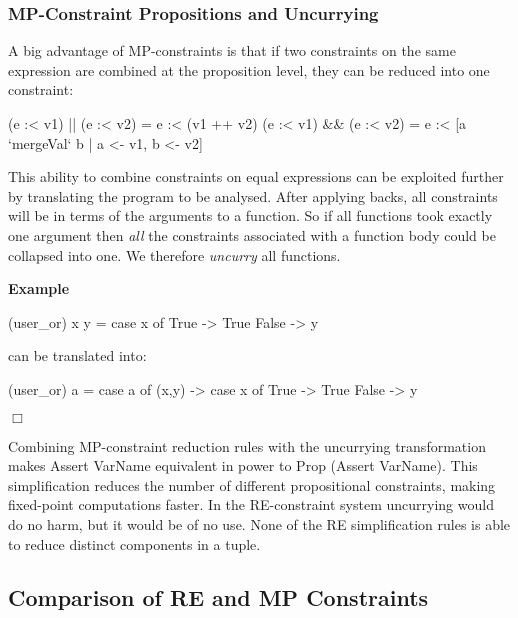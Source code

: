 \documentclass[preprint]{sigplanconf}
\newcommand{\C}[1]{\textsf{#1}}
\newcounter{exmp}
\newcommand{\yesexample}{\addtocounter{exmp}{1}\addvspace{2mm}\noindent\textbf{Example \arabic{exmp}}}
\newcommand{\noexample}{\hfill\ensuremath{\Box}\par\addvspace{2mm}}
\newenvironment{example}{\yesexample}{\noexample}
\begin{document}
\subsubsection{MP-Constraint Propositions and Uncurrying}

A big advantage of MP-constraints is that if two constraints on the same expression are combined at the proposition level, they can be reduced into one constraint:

\begin{code}
(e :< v1) || (e :< v2) = e :< (v1 ++ v2)
(e :< v1) && (e :< v2) = e :< [a `mergeVal` b | a <- v1, b <- v2]
\end{code}

\noindent This ability to combine constraints on equal expressions can be exploited further by translating the program to be analysed. After applying \C{backs}, all constraints will be in terms of the arguments to a function. So if all functions took exactly one argument then \textit{all} the constraints associated with a function body could be collapsed into one. We therefore \textit{uncurry} all functions.

\begin{example}
\begin{code}
(user_or) x y = case  x of
                      True   -> True
                      False  -> y
\end{code}

\noindent can be translated into:

\begin{code}
(user_or) a = case  a of
                    (x,y) -> case  x of
                                   True    -> True
                                   False   -> y
\end{code}
\end{example}

Combining MP-constraint reduction rules with the uncurrying transformation makes \C{Assert VarName} equivalent in power to \C{Prop (Assert VarName)}. This simplification reduces the number of different propositional constraints, making fixed-point computations faster. In the RE-constraint system uncurrying would do no harm, but it would be of no use. None of the RE simplification rules is able to reduce distinct components in a tuple.

\subsection{Comparison of RE and MP Constraints}
\end{document}
